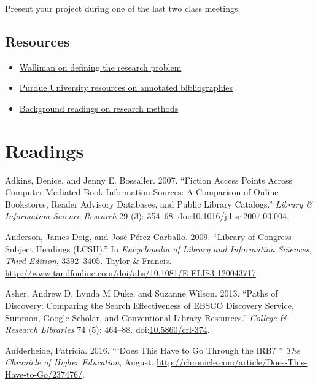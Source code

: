 \documentclass[]{article}
\providecommand{\tightlist}{%
  \setlength{\itemsep}{0pt}\setlength{\parskip}{0pt}}
\begin{document}
Present your project during one of the last two class meetings.

\subsection{Resources}\label{resources-1}

\begin{itemize}
\tightlist
\item
  \href{http://methods.sagepub.com/book/social-research-methods/n6.xml}{Walliman
  on defining the research problem}
\item
  \href{https://owl.english.purdue.edu/owl/resource/614/01/}{Purdue
  University resources on annotated bibliographies}
\item
  \href{https://www.zotero.org/groups/lis501/items/collectionKey/7TJ9WWEE}{Background
  readings on research methods}
\end{itemize}

\section*{Readings}\label{readings}

\hypertarget{refs}{}
\hypertarget{ref-adkinsux5ffictionux5f2007}{}
Adkins, Denice, and Jenny E. Bossaller. 2007. ``Fiction Access Points
Across Computer-Mediated Book Information Sources: A Comparison of
Online Bookstores, Reader Advisory Databases, and Public Library
Catalogs.'' \emph{Library \& Information Science Research} 29 (3):
354--68.
doi:\href{https://doi.org/10.1016/j.lisr.2007.03.004}{10.1016/j.lisr.2007.03.004}.

\hypertarget{ref-andersonux5flibraryux5f2009}{}
Anderson, James Doig, and José Pérez-Carballo. 2009. ``Library of
Congress Subject Headings (LCSH).'' In \emph{Encyclopedia of Library and
Information Sciences, Third Edition}, 3392--3405. Taylor \& Francis.
\url{http://www.tandfonline.com/doi/abs/10.1081/E-ELIS3-120043717}.

\hypertarget{ref-asherux5fpathsux5f2013}{}
Asher, Andrew D, Lynda M Duke, and Suzanne Wilson. 2013. ``Paths of
Discovery: Comparing the Search Effectiveness of EBSCO Discovery
Service, Summon, Google Scholar, and Conventional Library Resources.''
\emph{College \& Research Libraries} 74 (5): 464--88.
doi:\href{https://doi.org/10.5860/crl-374}{10.5860/crl-374}.

\hypertarget{ref-aufderheideux5fdoesux5f2016}{}
Aufderheide, Patricia. 2016. ```Does This Have to Go Through the IRB?'''
\emph{The Chronicle of Higher Education}, August.
\url{http://chronicle.com/article/Does-This-Have-to-Go/237476/}.
\end{document}
